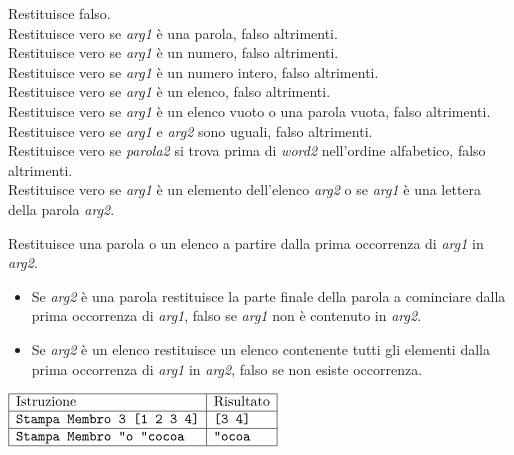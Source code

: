  Restituisce \textquotedbl falso.\\

 Restituisce vero se \textit{arg1} è una parola, falso altrimenti.\\

 Restituisce vero se \textit{arg1} è un numero, falso altrimenti.\\

 Restituisce vero se \textit{arg1} è un numero intero, falso altrimenti.\\

 Restituisce vero se \textit{arg1} è un elenco, falso altrimenti.\\

 Restituisce vero se \textit{arg1} è un elenco vuoto o una parola vuota, falso altrimenti.\\

 Restituisce vero se \textit{arg1} e \textit{arg2} sono uguali, falso altrimenti.\\

Restituisce vero se \textit{parola2} si trova prima di \textit{word2} nell'ordine alfabetico, falso altrimenti.\\

Restituisce vero se \textit{arg1} è un elemento dell'elenco \textit{arg2} o se \textit{arg1} è una lettera della parola \textit{arg2}.

 Restituisce una parola o un elenco a partire dalla prima occorrenza di \textit{arg1} in \textit{arg2}.
\begin{itemize}
	\item Se \textit{arg2} è una parola restituisce la parte finale della parola a cominciare dalla prima occorrenza di \textit{arg1}, falso se \textit{arg1} non è contenuto in \textit{arg2}.
	\item Se \textit{arg2} è un elenco restituisce un elenco contenente tutti gli elementi dalla prima occorrenza di \textit{arg1} in \textit{arg2}, falso se non esiste occorrenza.
\end{itemize}
$\begin{array}{|l|l|}
	\hline \textrm{Istruzione} & \textrm{Risultato} \\ \hline
	\texttt{Stampa Membro 3 [1 2 3 4]}								& \texttt{[3 4]}\\
	\hline
	\texttt{Stampa Membro \textquotedbl o \textquotedbl cocoa}		& \texttt{\textquotedbl ocoa}\\
	\hline
\end{array}$

